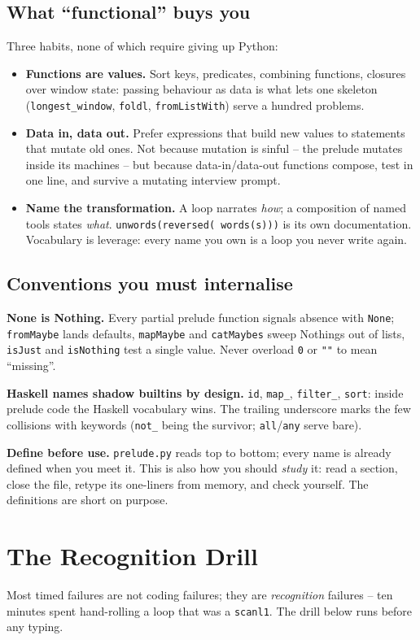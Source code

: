 \documentclass[11pt,letterpaper]{book}
\begin{document}
\section{What ``functional'' buys you}
Three habits, none of which require giving up Python:

\begin{itemize}
\item \textbf{Functions are values.} Sort keys, predicates, combining
functions, closures over window state: passing behaviour as data is what lets
one skeleton (\texttt{longest\_window}, \texttt{foldl},
\texttt{fromListWith}) serve a hundred problems.
\item \textbf{Data in, data out.} Prefer expressions that build new values to
statements that mutate old ones. Not because mutation is sinful -- the prelude
mutates inside its machines -- but because data-in/data-out functions compose,
test in one line, and survive a mutating interview prompt.
\item \textbf{Name the transformation.} A loop narrates \emph{how}; a
composition of named tools states \emph{what}. \texttt{unwords(reversed(%
words(s)))} is its own documentation. Vocabulary is leverage: every name you
own is a loop you never write again.
\end{itemize}

\section{Conventions you must internalise}
\textbf{None is Nothing.} Every partial prelude function signals absence with
\texttt{None}; \texttt{fromMaybe} lands defaults, \texttt{mapMaybe} and
\texttt{catMaybes} sweep Nothings out of lists, \texttt{isJust} and
\texttt{isNothing} test a single value. Never overload \texttt{0} or
\texttt{""} to mean ``missing''.

\textbf{Haskell names shadow builtins by design.} \texttt{id}, \texttt{map\_},
\texttt{filter\_}, \texttt{sort}: inside prelude code the Haskell vocabulary
wins. The trailing underscore marks the few collisions with keywords
(\texttt{not\_} being the survivor; \texttt{all}/\texttt{any} serve bare).

\textbf{Define before use.} \texttt{prelude.py} reads top to bottom; every name
is already defined when you meet it. This is also how you should
\emph{study} it: read a section, close the file, retype its one-liners from
memory, and check yourself. The definitions are short on purpose.
\chapter{The Recognition Drill}
Most timed failures are not coding failures; they are \emph{recognition}
failures -- ten minutes spent hand-rolling a loop that was a \texttt{scanl1}.
The drill below runs before any typing.
\end{document}
